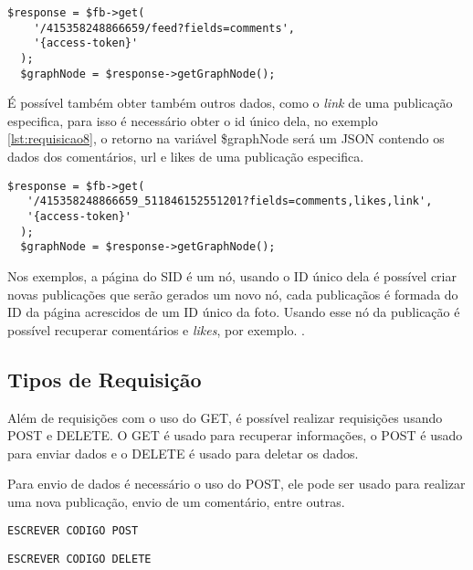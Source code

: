 \begin{lstlisting}[caption={Requisitar os comentários de todas as publicações da página},label={lst:requisicao7}]
  $response = $fb->get(
    '/415358248866659/feed?fields=comments',
    '{access-token}' 
  );
  $graphNode = $response->getGraphNode(); 
\end{lstlisting}

É possível também obter também outros dados, como o \textit{link} de uma publicação especifica, para isso é necessário obter o id único dela, no exemplo \ref{lst:requisicao8}, o retorno na variável \$graphNode será um JSON contendo os dados dos comentários, url e likes de uma publicação especifica.

\begin{lstlisting}[caption={Requsição de diversos atributos},label={lst:requisicao8}]
  $response = $fb->get(
   '/415358248866659_511846152551201?fields=comments,likes,link', 
   '{access-token}'
  );
  $graphNode = $response->getGraphNode();
\end{lstlisting}

Nos exemplos, a página do SID é um nó, usando o ID único dela é possível criar novas publicações que serão gerados um novo nó, cada publicaçãos é formada do ID da página acrescidos de um ID único da foto. Usando esse nó da publicação é possível recuperar comentários e \textit{likes}, por exemplo. \cite{facebook2018b}.

\subsection{Tipos de Requisição}
Além de requisições com o uso do GET, é possível realizar requisições usando POST e DELETE. O GET é usado para recuperar informações, o POST é usado para enviar dados e o DELETE é usado para deletar os dados.

Para envio de dados é necessário o uso do POST, ele pode ser usado para realizar uma nova publicação, envio de um comentário, entre outras.
\begin{lstlisting}[caption={Requsição de diversos atributos},label={lst:requisicao9}]
ESCREVER CODIGO POST
\end{lstlisting}

\begin{lstlisting}[caption={Requsição de diversos atributos},label={lst:requisicao10}]
ESCREVER CODIGO DELETE
\end{lstlisting}